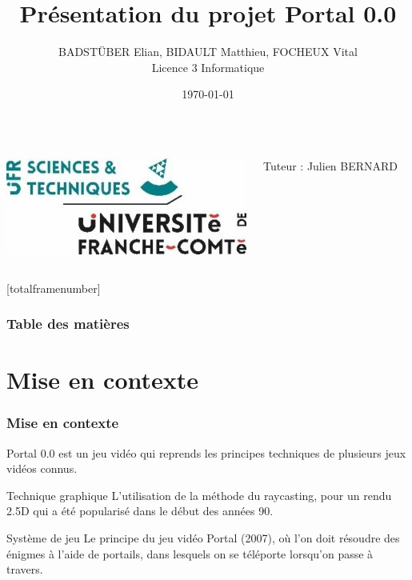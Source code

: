 \documentclass{beamer}
\begin{document}
\title{Présentation du projet Portal 0.0}
\author{BADSTÜBER Elian, BIDAULT Matthieu, FOCHEUX Vital \\
        Licence 3 Informatique}
\date{\today}

\begin{frame}
    \titlepage

    \vfill %
    \begin{columns}
        \centering
        \includegraphics[width=\textwidth]{images/logo-UFR-ST.jpg} 
    
        \begin{flushright}
            \small Tuteur : Julien BERNARD
        \end{flushright}    
    \end{columns}
\end{frame}

\setcounter{framenumber}{0}
[totalframenumber]

\begin{frame}
    \frametitle{Table des matières}
    \tableofcontents
\end{frame}

\section{Mise en contexte}

\begin{frame}
    \frametitle{Mise en contexte}
    \begin{block}{}
        Portal 0.0 est un jeu vidéo qui reprends les principes techniques 
        de plusieurs jeux vidéos connus.
    \end{block}

    \begin{block}{Technique graphique}
        L'utilisation de la méthode du raycasting, pour un rendu 2.5D qui a été 
        popularisé dans le début des années 90.
    \end{block}

    \begin{block}{Système de jeu}
        Le principe du jeu vidéo Portal (2007), où l'on doit résoudre des énigmes
        à l'aide de portails, dans lesquels on se téléporte lorsqu'on passe à travers.
    \end{block}
\end{frame}
\end{document}
